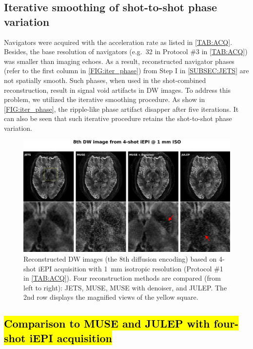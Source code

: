 \documentclass[preprint,12pt,authoryear,review]{elsarticle}
\begin{document}
    \subsection{Iterative smoothing of shot-to-shot phase variation}

    Navigators were acquired with the acceleration rate
    as listed in \cref{TAB:ACQ}.
    Besides, the base resolution of navigators
    (e.g.~32 in Protocol \#3 in \cref{TAB:ACQ})
    was smaller than imaging echoes.
    As a result, reconstructed navigator phases
    (refer to the first column in \cref{FIG:iter_phase})
    from Step I in \cref{SUBSEC:JETS}
    are not spatially smooth.
    Such phases, when used in the shot-combined reconstruction,
    result in signal void artifacts in DW images.
    To address this problem, we utilized the iterative smoothing procedure.
    As show in \cref{FIG:iter_phase},
    the ripple-like phase artifact disapper after five iterations.
    It can also be seen that such iterative procedure retains
    the shot-to-shot phase variation.


    \begin{figure}
        \centering
        \includegraphics[width=\textwidth]{../figures/fig4.png}
        \caption{Reconstructed DW images
        (the 8th diffusion encoding)
        based on 4-shot iEPI acquisition with 1~mm isotropic resolution
        (Protocol \#1 in \cref{TAB:ACQ}).
        Four reconstruction methods are compared (from left to right):
        JETS, MUSE, MUSE with denoiser, and JULEP.
        The 2nd row displays the magnified views of the yellow square.}
        \label{FIG:4shot_comp}
    \end{figure}

    \subsection{\hl{Comparison to MUSE and JULEP with four-shot iEPI acquisition}}
\end{document}

